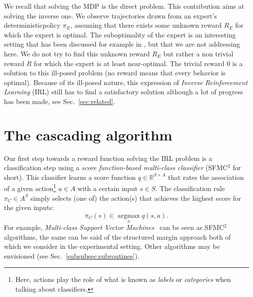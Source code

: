 \documentclass{llncs}
\newcommand{\argmax}{\operatorname*{argmax}} %
\begin{document}
We recall that solving the MDP is the direct problem. This contribution aims at solving the inverse one. We observe trajectories drawn from an expert's deterministic\footnotemark[\value{footnote}] policy $\pi_E$, assuming that there exists some unknown reward $R_E$ for which the expert is optimal. The suboptimality of the expert is an interesting setting that has been discussed for example in \cite{melo2010analysis,syed2010reduction}, but that we are not addressing here. We do not try to find this unknown reward $R_E$ but rather a non trivial reward $R$ for which the expert is at least near-optimal. The trivial reward $0$ is a solution to this ill-posed problem (no reward means that every behavior is optimal). Because of its ill-posed nature, this expression of \emph{Inverse Reinforcement Learning} (IRL) still has to find a satisfactory solution although a lot of progress has been made, see Sec.~\ref{sec:related}.
\section{The cascading algorithm}
\label{sec:algo}
Our first step towards a reward function solving the IRL problem is a classification step using a \emph{score function-based multi-class classifier} (SFMC$^2$ for short). This classifier learns a score function $q\in\mathbb{R}^{S\times A}$ that rates the association of a given action\footnote{Here, actions play the role of what is known as {\it labels} or {\it categories} when talking about classifiers.} $a\in A$ with a certain input $s\in S$. The classification rule $\pi_C\in A^S$ simply selects (one of) the action(s) that achieves the highest score for the given inputs:
\begin{equation}
  \label{eq:greedy2}
\pi_C(s) \in \argmax_a q(s,a).
\end{equation}
For example, \emph{Multi-class Support Vector Machines}~\cite{guermeur2011generic} can be seen as SFMC$^2$ algorithms, the same can be said of the structured margin approach \cite{taskar2005learning} both of which we consider in the experimental setting. Other algorithms may be envisioned (see Sec.~\ref{subsubsec:subroutines}).
\end{document}
